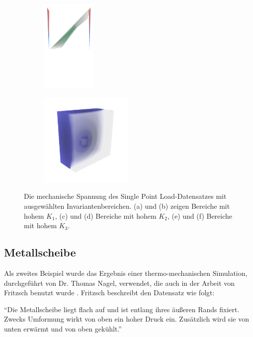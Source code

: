 \documentclass[a4paper,fontsize=12pt,toc=bib,halfparskip]{scrartcl}
\begin{document}
\begin{figure}
\begin{subfigure}{0.49\textwidth}
		\subcaption{}
		\label{SinglePointObject2}
	\end{subfigure}
	\medskip
	\begin{subfigure}{0.49\textwidth}
		\centering
		\includegraphics[height=4.5cm]{pictures/results/SinglePoint_InvariantSpace3.png}
		\subcaption{}
		\label{SinglePointInvariant3}
	\end{subfigure}
	\hspace*{\fill}
	\begin{subfigure}{0.49\textwidth}
		\centering
		\includegraphics[height=4.5cm]{pictures/results/SinglePoint_Object3.png}
		\subcaption{}
		\label{SinglePointObject3}
	\end{subfigure}
	\caption{Die mechanische Spannung des Single Point Load-Datensatzes mit ausgew\"ahlten Invariantenbereichen. (a) und (b) zeigen Bereiche mit hohem $K_1$, (c) und (d) Bereiche mit hohem $K_2$, (e) und (f) Bereiche mit hohem $K_3$.}
	\label{SinglePointInteraction}
\end{figure}



\subsection{Metallscheibe}
Als zweites Beispiel wurde das Ergebnis einer thermo-mechanischen Simulation, durchgef\"uhrt von Dr. Thomas Nagel, verwendet, die auch in der Arbeit von Fritzsch benutzt wurde \cite[S.15, 45 ff.]{fritzsch2016continuousScatterplot}. Fritzsch beschreibt den Datensatz wie folgt:

``Die Metallscheibe liegt flach auf und ist entlang ihres \"au{\ss}eren Rands fixiert. Zwecks Umformung wirkt von oben ein hoher Druck ein. Zus\"atzlich wird sie von unten erw\"armt und von oben gek\"uhlt.''\cite[S.~15]{fritzsch2016continuousScatterplot}
\end{document}
